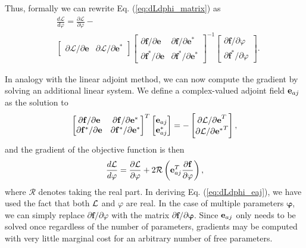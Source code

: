 %
Thus, formally we can rewrite Eq. (\ref{eq:dLdphi_matrix}) as
%
\begin{align}
& \frac{d\mathcal{L}}{d\varphi} = \frac{\partial\mathcal{L}}{\partial\varphi} - \label{eq:dLdphi}\\
& \begin{bmatrix}
\partial\mathcal{L} / \partial\mathbf{e} &
\partial\mathcal{L} / \partial\mathbf{e}^*
\end{bmatrix}
\begin{bmatrix}
\partial \mathbf{f} / \partial \mathbf{e} &
\partial \mathbf{f} / \partial \mathbf{e}^* \\
\partial \mathbf{f}^* / \partial \mathbf{e} &
\partial \mathbf{f}^* / \partial \mathbf{e}^*
\end{bmatrix}^{-1}
\begin{bmatrix}
\partial \mathbf{f} / \partial \varphi \\ \partial \mathbf{f}^* / \partial \varphi
\end{bmatrix}.
\nonumber
\end{align}

In analogy with the linear adjoint method, we can now compute the gradient by solving an additional linear system.  We define a complex-valued adjoint field $\mathbf{e}_{aj}$ as the solution to
%
\begin{align}
\begin{bmatrix}
\partial \mathbf{f} / \partial \mathbf{e} &
\partial \mathbf{f} / \partial \mathbf{e}^* \\
\partial \mathbf{f}^* / \partial \mathbf{e} &
\partial \mathbf{f}^* / \partial \mathbf{e}^*
\end{bmatrix}^{T}
\begin{bmatrix}
\mathbf{e}_{aj} \\ \mathbf{e}_{aj}^*
\end{bmatrix} = - \begin{bmatrix}
{\partial\mathcal{L} / \partial\mathbf{e}}^T \\
{\partial\mathcal{L} / \partial\mathbf{e}^*}^T
\end{bmatrix}, 
\label{eq:eaj}
\end{align}
%
and the gradient of the objective function is then
%
\begin{align}
\frac{d\mathcal{L}}{d\varphi} = \frac{\partial\mathcal{L}}{\partial\varphi} + 2\mathcal{R}\left(
\mathbf{e}_{aj}^T
\frac{\partial \mathbf{f}} { \partial \varphi} \right)
\label{eq:dLdphi_eaj},
\end{align}
%
where $\mathcal{R}$ denotes taking the real part. In deriving Eq. (\ref{eq:dLdphi_eaj}), we have used the fact that both $\mathcal{L}$ and $\varphi$ are real.  In the case of multiple parameters $\bm{\varphi}$, we can simply replace $\partial \mathbf{f} / \partial \varphi$ with the matrix $\partial \mathbf{f} / \partial \bm{\varphi}$. Since $\mathbf{e}_{aj}$ only needs to be solved once regardless of the number of parameters, gradients may be computed with very little marginal cost for an arbitrary number of free parameters.

